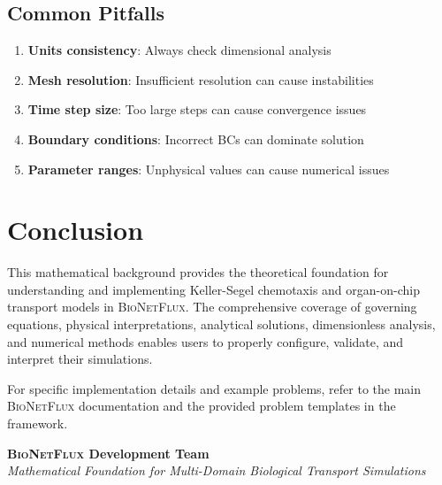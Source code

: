 \documentclass[11pt,a4paper]{article}
\newcommand{\bionetflux}{\textsc{BioNetFlux}}
\begin{document}
\subsection{Common Pitfalls}

\begin{enumerate}
    \item \textbf{Units consistency}: Always check dimensional analysis
    \item \textbf{Mesh resolution}: Insufficient resolution can cause instabilities
    \item \textbf{Time step size}: Too large steps can cause convergence issues
    \item \textbf{Boundary conditions}: Incorrect BCs can dominate solution
    \item \textbf{Parameter ranges}: Unphysical values can cause numerical issues
\end{enumerate}

\section{Conclusion}

This mathematical background provides the theoretical foundation for understanding and implementing Keller-Segel chemotaxis and organ-on-chip transport models in \bionetflux{}. The comprehensive coverage of governing equations, physical interpretations, analytical solutions, dimensionless analysis, and numerical methods enables users to properly configure, validate, and interpret their simulations.

For specific implementation details and example problems, refer to the main \bionetflux{} documentation and the provided problem templates in the framework.

\vspace{2cm}

\begin{center}
\textbf{\bionetflux{} Development Team} \\
\textit{Mathematical Foundation for Multi-Domain Biological Transport Simulations}
\end{center}
\end{document}

